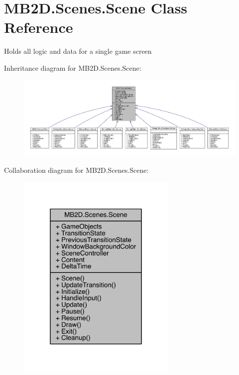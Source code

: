 \hypertarget{class_m_b2_d_1_1_scenes_1_1_scene}{}\section{M\+B2\+D.\+Scenes.\+Scene Class Reference}
\label{class_m_b2_d_1_1_scenes_1_1_scene}


Holds all logic and data for a single game screen  




Inheritance diagram for M\+B2\+D.\+Scenes.\+Scene\+:
\nopagebreak
\begin{figure}[H]
\begin{center}
\leavevmode
\includegraphics[width=350pt]{class_m_b2_d_1_1_scenes_1_1_scene__inherit__graph}
\end{center}
\end{figure}


Collaboration diagram for M\+B2\+D.\+Scenes.\+Scene\+:
\nopagebreak
\begin{figure}[H]
\begin{center}
\leavevmode
\includegraphics[width=217pt]{class_m_b2_d_1_1_scenes_1_1_scene__coll__graph}
\end{center}
\end{figure}
